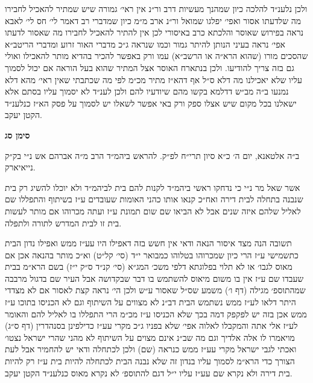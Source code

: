 \documentclass[12pt, openany]{book}
\newcommand{\chapname}{}
\newcommand{\newchap}[1]{
	\addcontentsline{toc}{chapter}{#1}
	\renewcommand{\chapname}{#1}
		\begin{center}
			\textbf{%
\fontsize{16pt}{16pt}\selectfont
				#1}
		\end{center}
}
\begin{document}
\begin{multicols}{2}
ולכן נלענ״ד להלכה כיון שמהנך מעשיות דרב ור״נ אין ראי׳ גמורה שיש שמתיר להאכיל לחבירו מה שלדעתו אסור ואפי׳ יפלגו שמואל ור״נ ארב מ״מ כיון שמדברי רב דאמר לי׳ חס לי׳ לאבא נראה בפירוש שאוסר והלכתא כרב באיסורי לכן אין להתיר להאכיל לחבירו מה שאסור לדעתו אפי׳ נראה בעיני הנותן להיתר גמור וכמו שנראה ג״כ מדברי האור זרוע ומדברי הריטב״א שהסכים מורו (שהוא הרא״ה או הרשב״א) עמו ורק באפשר להכיר בהדיא מותר להאכילו ואולי גם בזה צריך להודיעו. ולכן בנתארח האוסר אצל המתיר שהוא בעל הוראה אם יכול לסמוך עליו שלא יאכילנו מה דלא ס״ל אף דהא״ז מתיר מכ״מ לפי מה שכתבתי שאין ראי׳ מהא דלא נמנעו ב״ה מב״ש דדלמא בקשו מהם שיודעיו להם ולכן לענ״ד לא יסמוך עליו בסתם אלא ישאלנו בכל מקום שיש אצלו ספק ורק באי אפשר לשאלו יש לסמוך על פסק הא״ז כנלענ״ד הקטן יעקב.\\\vspace{0pt}

\end{multicols}\newpage

\newchap{סימן סג}
\begin{multicols}{2}
ב״ה אלטאנא, יום ה׳ כ״א סיון תרי״ח לפ״ק. להראש ביהמ״ד הרב מ״ה אברהם אש נ״י בק״ק נייאיארק.\\\vspace{0pt}

אשר שאל מר נ״י כי נדחקו ראשי ביהמ״ד לקנות להם בית לביהמ״ד ולא יוכלו להשיג רק בית שנבנה בתחלה לבית דירה ואח״כ קנאו אותו כהני האומות שעובדים ע״ז בשיתוף והתפללו שם לאליל שלהם איזה שנים אבל לא הביאו שם שום תמונת ע״ז ועתה מכרוהו אם מותר לעשות בית זו לבית המדרש לתורה ולתפלה.\\\vspace{0pt}

תשובה הנה מצד איסור הנאה ודאי אין חשש בזה דאפילו היו עע״ז ממש ואפילו נדון הבית כתשמישי ע״ז הרי כיון שמכרוהו בטלוהו כמבואר י״ד (סי׳ קל״ט) וא״כ מותר בהנאה אכן אם מאוס לגבו׳ או לא תלוי בפלוגתא דלפי משכ׳ המג״א (סי׳ קנ״ד ס״ק י״ז) בשם הרא״מ בבית שעבדו שם ע״ז אין בו משום מיאוס להשתמש בו דבר שבקדושה אבל העיר שם בדגול מרבבה שמהתוספ׳ מגילה (דף ו׳) משמע שס״ל שאסור ע״ש ולכן הי׳ נראה קצת לאסור אם לא מצדדי היתר דלאו לע״ז ממש נשתמש הבית דב״נ לא מצווים על השיתוף וגם לא הכניסו בתוכו ע״ז ממש אכן בזה יש לפקפק דמה בכך שלא הכניסו ע״ז מכ״מ הרי התפללו בו לאליל להם והאומר לע״ז אלי אתה והמקבלו לאלוה אפי׳ שלא בפניו ג״כ מקרי עע״ז כדילפינן בסנהדרין (דף ס״ג) מויאמרו לו אלה אלדיך וגם מה שב״נ אינם מצוים על השיתוף לא מהני שהרי ישראל נצטו׳ ואכתי לגבי ישראל מקרי עע״ז ממש כנראה (שם) ולכן לכתחלה ודאי יש להחמיר אבל לעת הצורך כדי הרא״מ לסמוך עליו בנדון זה שלא נבנה הבית לכתחלה להיות בית ע״ז רק להיות בית דירה ולא נקרא שם עע״ז עליו י״ל דגם להתוספ׳ לא נקרא מאוס כנלענ״ד הקטן יעקב.\\\vspace{0pt}

\end{multicols}\newpage
\end{document}
